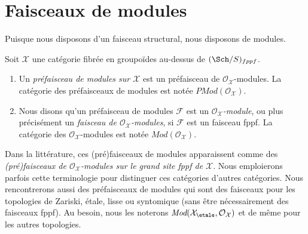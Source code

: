 \section{Faisceaux de modules}
\label{section-modules}

\noindent
Puisque nous disposons d'un faisceau structural, nous disposons de modules.

\begin{definition}
\label{definition-modules}
Soit $\mathcal{X}$ une catégorie fibrée en groupoïdes au-dessus de
$(\Sch/S)_{fppf}$.
\begin{enumerate}
\item Un {\it préfaisceau de modules sur $\mathcal{X}$} est un
préfaisceau de $\mathcal{O}_\mathcal{X}$-modules. La catégorie des
préfaisceaux de modules est notée $\textit{PMod}(\mathcal{O}_\mathcal{X})$.
\item Nous disons qu'un préfaisceau de modules $\mathcal{F}$ est un
{\it $\mathcal{O}_\mathcal{X}$-module}, ou plus précisément un
{\it faisceau de $\mathcal{O}_\mathcal{X}$-modules}, si $\mathcal{F}$
est un faisceau fppf. La catégorie des $\mathcal{O}_\mathcal{X}$-modules
est notée $\textit{Mod}(\mathcal{O}_\mathcal{X})$.
\end{enumerate}
\end{definition}

\noindent
Dans la littérature, ces (pré)faisceaux de modules apparaissent comme des {\it (pré)faisceaux
de $\mathcal{O}_\mathcal{X}$-modules sur le grand site fppf de $\mathcal{X}$}.
Nous emploierons parfois cette terminologie pour distinguer ces
catégories d'autres catégories. Nous rencontrerons aussi des préfaisceaux de modules qui
sont des faisceaux pour les topologies de Zariski, \'etale, lisse ou syntomique
(sans être nécessairement des faisceaux fppf). Au besoin, nous les noterons
$\textit{Mod}(\mathcal{X}_\etale, \mathcal{O}_\mathcal{X})$
et de même pour les autres topologies.

